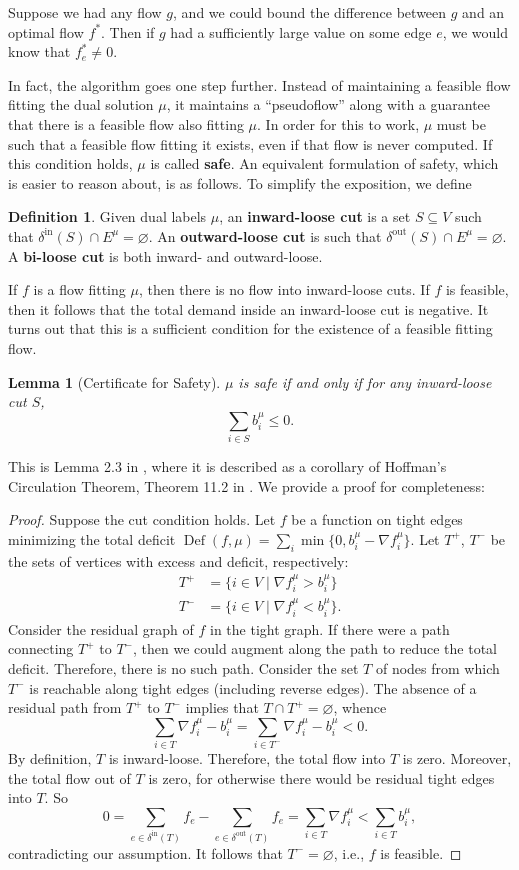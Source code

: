 \documentclass[11pt]{article}
\newtheorem{lemma}[theorem]{Lemma}
\theoremstyle{definition}
\newtheorem{definition}{Definition}[section]
\theoremstyle{definition}
\newcommand{\fu}{f^{\mu}}
\newcommand{\nfiu}{\nabla \fu_i}
\newcommand{\biu}{b_{i}^{\mu}}
\newcommand{\din}{\delta^{\text{in}}}
\newcommand{\dout}{\delta^{\text{out}}}
\DeclareMathOperator{\Def}{Def}
\begin{document}
	Suppose we had any flow $g$, and we could bound the difference between $g$ and an optimal
	flow $f^*$. Then if $g$ had a sufficiently large value on some edge $e$, we would know that
	$f^*_e \neq 0$.
	
	In fact, the algorithm goes one step further. Instead of maintaining a feasible flow
	fitting the dual solution $\mu$, it maintains a ``pseudoflow'' along with a guarantee
	that there is a feasible flow also fitting $\mu$. In order for this to work, $\mu$
	must be such that a feasible flow fitting it exists, even if that flow is never
	computed. If this condition holds, $\mu$ is called \textbf{safe}. An equivalent
	formulation of safety, which is easier to reason about, is as follows. To simplify
	the exposition, we define 
	\begin{definition}
		Given dual labels $\mu$, an \textbf{inward-loose cut} is a set $S \subseteq V$ such that
		$\din(S) \cap E^\mu = \varnothing$. An \textbf{outward-loose cut}
		is such that $\dout(S) \cap E^\mu = \varnothing$. A \textbf{bi-loose cut}
		is both inward- and outward-loose.
	\end{definition}
	If $f$ is a flow fitting $\mu$, then there is no flow into inward-loose cuts.
	If $f$ is feasible, then it follows that the total demand inside an inward-loose
	cut is negative. It turns out that this is a sufficient condition for the existence
	of a feasible fitting flow.
	\begin{lemma}[Certificate for Safety] \label{lem.safety}
	$\mu$ is safe if and only if for any inward-loose cut $S$,
	\[ \sum_{i \in S} \biu \leq 0. \]
	\end{lemma}
	This is Lemma 2.3 in \cite{Olver2017}, where it is described as a corollary of Hoffman's Circulation
	Theorem, Theorem 11.2 in \cite{Schrijver2002}. We provide a proof for completeness:
	\begin{proof}
		Suppose the cut condition holds. Let $f$ be a function on tight edges minimizing
		the total deficit $\Def(f, \mu) = \sum_i \min\{0, \biu - \nfiu\}$. Let
		$T^+$, $T^-$ be the sets of vertices with excess and deficit, respectively:
		\begin{align*}
			T^+ &= \{i \in V \mid \nfiu > \biu \} \\
			T^- &= \{i \in V \mid \nfiu < \biu \}.
		\end{align*}
		Consider the residual graph of $f$ in the tight graph. If there were a path
		connecting $T^+$ to $T^-$, then we could augment along the path
		to reduce the total deficit. Therefore, there is no such path. Consider the
		set $T$ of nodes from which $T^-$ is reachable along tight edges (including reverse edges).
		The absence of a residual path from $T^+$ to $T^-$
        implies that $T \cap T^+ = \varnothing$, whence
		\[ \sum_{i \in T} \nfiu - \biu = \sum_{i \in T^-} \nfiu - \biu < 0. \]
		By definition, $T$ is inward-loose. Therefore, the total flow into $T$ is zero.
        Moreover, the total flow out of $T$ is zero, for otherwise there would be
        residual tight edges into $T$. So
		\[ 0 = \sum_{e \in \din(T)} f_e - \sum_{e \in \dout(T)} f_e
		     = \sum_{i \in T} \nfiu < \sum_{i \in T} \biu, \]
		contradicting our assumption. It follows that $T^- = \varnothing$, i.e., $f$
		is feasible.
	\end{proof}
\end{document}

